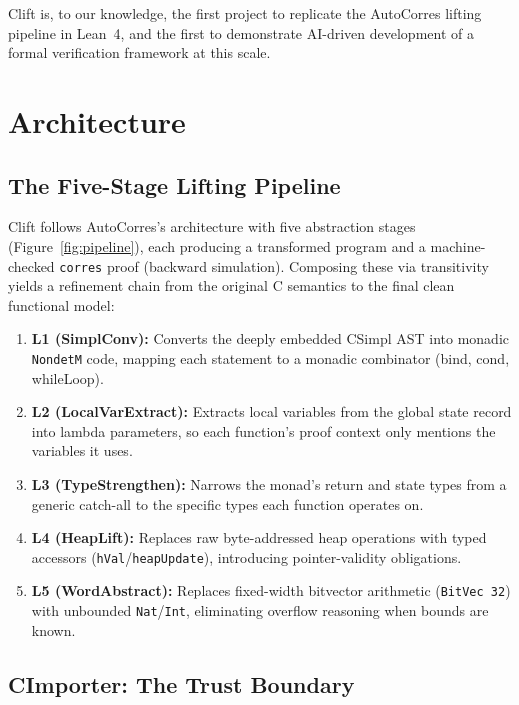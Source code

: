 \documentclass[sigconf,nonacm,screen]{acmart}
\begin{document}
Clift is, to our knowledge, the first project to replicate the
AutoCorres lifting pipeline in Lean~4, and the first to demonstrate
AI-driven development of a formal verification framework at this scale.

\section{Architecture}



\subsection{The Five-Stage Lifting Pipeline}

Clift follows AutoCorres's architecture with five abstraction stages
(Figure~\ref{fig:pipeline}), each producing a transformed program and
a machine-checked \texttt{corres} proof (backward simulation).
Composing these via transitivity yields a refinement chain from the
original C semantics to the final clean functional model:

\begin{enumerate}
\item \textbf{L1 (SimplConv):} Converts the deeply embedded CSimpl AST
  into monadic \texttt{NondetM} code, mapping each statement to a
  monadic combinator (bind, cond, whileLoop).
\item \textbf{L2 (LocalVarExtract):} Extracts local variables from the
  global state record into lambda parameters, so each function's proof
  context only mentions the variables it uses.
\item \textbf{L3 (TypeStrengthen):} Narrows the monad's return and state
  types from a generic catch-all to the specific types each function
  operates on.
\item \textbf{L4 (HeapLift):} Replaces raw byte-addressed heap
  operations with typed accessors (\texttt{hVal}/\texttt{heapUpdate}),
  introducing pointer-validity obligations.
\item \textbf{L5 (WordAbstract):} Replaces fixed-width bitvector
  arithmetic (\texttt{BitVec~32}) with unbounded \texttt{Nat}/\texttt{Int},
  eliminating overflow reasoning when bounds are known.
\end{enumerate}



\subsection{CImporter: The Trust Boundary}
\end{document}
